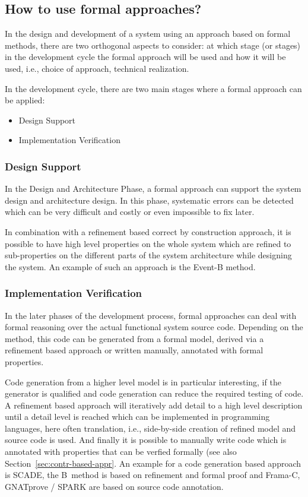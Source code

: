 \subsection{How to use formal approaches?}

In the design and development of a system using an approach based on
formal methods, there are two orthogonal aspects to consider: at which
stage (or stages) in the development cycle the formal approach will be
used and how it will be used, i.e., choice of approach, technical
realization.

In the development cycle, there are two main stages where a formal
approach can be applied:

\begin{itemize}
\item Design Support
\item Implementation Verification
\end{itemize}

\subsubsection{Design Support}
\label{sec:design-support}

In the Design and Architecture Phase, a formal approach can support the
system design and architecture design. In this phase, systematic errors
can be detected which can be very difficult and costly or even impossible
to fix later.

In combination with a refinement based correct by construction approach,
it is possible to have high level properties on the whole system which
are refined to sub-properties on the different parts of the system
architecture while designing the system. An example of such an approach
is the Event-B method.

\subsubsection{Implementation Verification}
\label{sec:impl-verif}

In the later phases of the development process, formal approaches can
deal with formal reasoning over the actual functional system source
code. Depending on the method, this code can be generated from a formal
model, derived via a refinement based approach or written manually,
annotated with formal properties.

Code generation from a higher level model is in particular interesting,
if the generator is qualified and code generation can reduce the required
testing of code. A refinement based approach will iteratively add detail
to a high level description until a detail level is reached which can be
implemented in programming languages, here often translation, i.e.,
side-by-side creation of refined model and source code is used. And
finally it is possible to manually write code which is annotated with
properties that can be verfied formally (see also
Section~\ref{sec:contr-based-appr}. An example for a code generation
based approach is SCADE, the B~method is based on refinement and formal
proof and Frama-C, GNATprove / SPARK are based on source code annotation.

